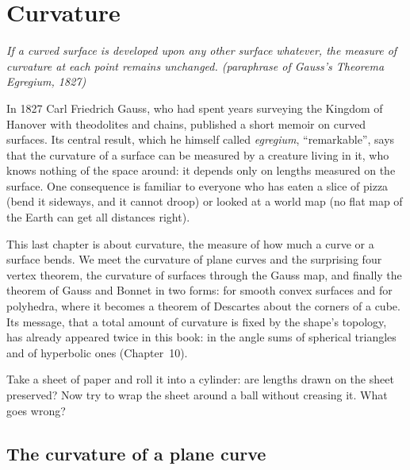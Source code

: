\chapter{Curvature}\label{ch:curvature}

\begin{center}\itshape
If a curved surface is developed upon any other surface whatever, the measure of curvature at each point remains unchanged.
\upshape(paraphrase of Gauss's \emph{Theorema Egregium}, 1827)
\end{center}

In 1827 Carl Friedrich Gauss, who had spent years surveying the Kingdom of Hanover with theodolites and chains, published a short memoir on curved
surfaces. Its central result, which he himself called \emph{egregium}, ``remarkable'', says that the curvature of a surface can be measured by a creature
living in it, who knows nothing of the space around: it depends only on lengths measured on the surface. One consequence is familiar to everyone who has
eaten a slice of pizza (bend it sideways, and it cannot droop) or looked at a world map (no flat map of the Earth can get all distances right).

This last chapter is about curvature, the measure of how much a curve or a surface bends. We meet the curvature of plane curves and the surprising
four vertex theorem, the curvature of surfaces through the Gauss map, and finally the theorem of Gauss and Bonnet in two forms: for smooth convex surfaces
and for polyhedra, where it becomes a theorem of Descartes about the corners of a cube. Its message, that a total amount of curvature is fixed by the
shape's topology, has already appeared twice in this book: in the angle sums of spherical triangles and of hyperbolic ones (Chapter~10).

\begin{think}
Take a sheet of paper and roll it into a cylinder: are lengths drawn on the sheet preserved? Now try to wrap the sheet around a ball without creasing it.
What goes wrong?
\end{think}

\section{The curvature of a plane curve}

